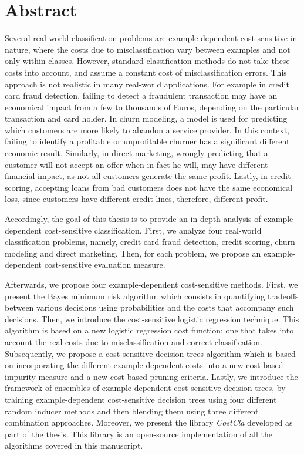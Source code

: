\chapter*{Abstract}

Several real-world classification problems are example-dependent cost-sensitive in nature, where the 
costs due to misclassification vary between examples and not only within classes. However, standard 
classification methods do not take these costs into account, and assume a constant cost of 
misclassification errors. This approach is not realistic in many real-world applications. For  
example in credit card fraud detection, failing to detect a fraudulent transaction may have an 
economical impact from a few to thousands of Euros, depending on the particular transaction and card 
holder. In churn modeling, a model is used for predicting which customers are more likely to 
abandon a service provider. In this context, failing to identify a   profitable or unprofitable 
churner has a significant different economic   result. Similarly, in direct marketing, wrongly 
predicting that a customer   will not accept an offer when in fact he will, may have different 
financial impact, as not all   customers generate the same profit. Lastly, in credit scoring, 
accepting   loans from bad customers does not have the same economical loss, since customers have 
different   credit lines, therefore, different profit.

Accordingly, the goal of this thesis is to provide an in-depth analysis of example-dependent 
cost-sensitive classification. First, we analyze four real-world classification problems, namely, 
credit card fraud detection, credit scoring, churn modeling and direct marketing. Then, 
for each problem, we propose an example-dependent cost-sensitive evaluation measure.

Afterwards, we propose four example-dependent cost-sensitive methods. First, we present the Bayes 
minimum risk algorithm which consists in quantifying tradeoffs between various decisions using 
probabilities and the costs that accompany such decisions. Then, we introduce the cost-sensitive 
logistic regression technique. This algorithm is based on a new logistic regression cost function; 
one that takes into account the real costs due to misclassification and correct classification. 
Subsequently, we propose a cost-sensitive decision trees algorithm which is based on incorporating 
the different example-dependent costs into a new cost-based impurity measure and a new cost-based 
pruning criteria. Lastly, we introduce the framework of ensembles of example-dependent 
cost-sensitive decision-trees, by training example-dependent cost-sensitive decision trees using 
four different random inducer methods and then blending them using three different combination 
approaches. Moreover, we present the library \mbox{\textit{CostCla}} developed as part of the 
thesis. This library is an open-source implementation of all the algorithms covered in this 
manuscript.

